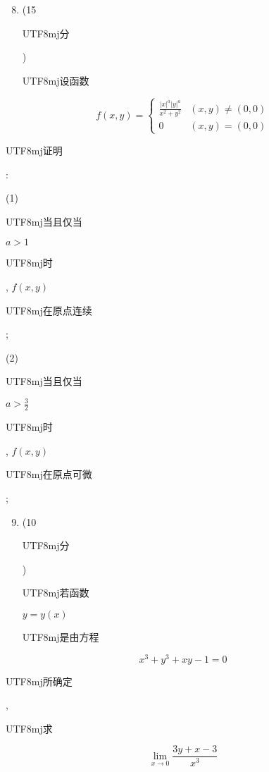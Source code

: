 \documentclass[10pt]{article}
\begin{document}
\begin{enumerate}
  \setcounter{enumi}{7}
  \item (15 \begin{CJK}{UTF8}{mj}分\end{CJK}) \begin{CJK}{UTF8}{mj}设函数\end{CJK}
\end{enumerate}
$$
f(x, y)=\left\{\begin{array}{cc}
\frac{|x|^{a}|y|^{a}}{x^{2}+y^{2}} & (x, y) \neq(0,0) \\
0 & (x, y)=(0,0)
\end{array}\right.
$$
\begin{CJK}{UTF8}{mj}证明\end{CJK}:

(1) \begin{CJK}{UTF8}{mj}当且仅当\end{CJK} $a>1$ \begin{CJK}{UTF8}{mj}时\end{CJK}, $f(x, y)$ \begin{CJK}{UTF8}{mj}在原点连续\end{CJK};

(2) \begin{CJK}{UTF8}{mj}当且仅当\end{CJK} $a>\frac{3}{2}$ \begin{CJK}{UTF8}{mj}时\end{CJK}, $f(x, y)$ \begin{CJK}{UTF8}{mj}在原点可微\end{CJK};

\begin{enumerate}
  \setcounter{enumi}{8}
  \item (10 \begin{CJK}{UTF8}{mj}分\end{CJK}) \begin{CJK}{UTF8}{mj}若函数\end{CJK} $y=y(x)$ \begin{CJK}{UTF8}{mj}是由方程\end{CJK}
\end{enumerate}
$$
x^{3}+y^{3}+x y-1=0
$$
\begin{CJK}{UTF8}{mj}所确定\end{CJK}, \begin{CJK}{UTF8}{mj}求\end{CJK}
$$
\lim _{x \rightarrow 0} \frac{3 y+x-3}{x^{3}}
$$
\end{document}
